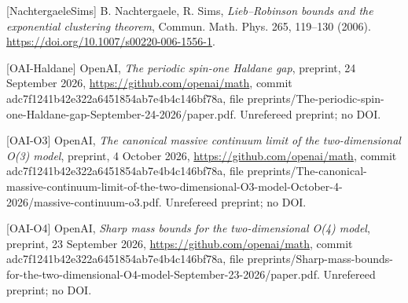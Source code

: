 \documentclass[10pt,letterpaper,twocolumn]{article}
\begin{document}
{[}NachtergaeleSims{]} B. Nachtergaele, R. Sims, \emph{Lieb--Robinson bounds and the exponential clustering theorem}, Commun. Math. Phys. 265, 119--130 (2006). \href{https://doi.org/10.1007/s00220-006-1556-1}{https:\allowbreak{}/\allowbreak{}/\allowbreak{}doi.\allowbreak{}org/\allowbreak{}10.\allowbreak{}1007/\allowbreak{}s00220-\allowbreak{}006-\allowbreak{}1556-\allowbreak{}1}.

{[}OAI-Haldane{]} OpenAI, \emph{The periodic spin-one Haldane gap}, preprint, 24 September 2026, \href{https://github.com/openai/math}{https:\allowbreak{}/\allowbreak{}/\allowbreak{}github.\allowbreak{}com/\allowbreak{}openai/\allowbreak{}math}, commit adc7f124\allowbreak{}1b42e322\allowbreak{}a6451854\allowbreak{}ab7e4b4c\allowbreak{}146bf78a\allowbreak{}, file preprint\allowbreak{}s/\allowbreak{}The-\allowbreak{}periodic\allowbreak{}-\allowbreak{}spin-\allowbreak{}one-\allowbreak{}Haldane-\allowbreak{}gap-\allowbreak{}Septembe\allowbreak{}r-\allowbreak{}24-\allowbreak{}2026/\allowbreak{}paper.\allowbreak{}pdf. Unrefereed preprint; no DOI.

{[}OAI-O3{]} OpenAI, \emph{The canonical massive continuum limit of the two-dimensional O(3) model}, preprint, 4 October 2026, \href{https://github.com/openai/math}{https:\allowbreak{}/\allowbreak{}/\allowbreak{}github.\allowbreak{}com/\allowbreak{}openai/\allowbreak{}math}, commit adc7f124\allowbreak{}1b42e322\allowbreak{}a6451854\allowbreak{}ab7e4b4c\allowbreak{}146bf78a\allowbreak{}, file preprint\allowbreak{}s/\allowbreak{}The-\allowbreak{}canonica\allowbreak{}l-\allowbreak{}massive-\allowbreak{}continuu\allowbreak{}m-\allowbreak{}limit-\allowbreak{}of-\allowbreak{}the-\allowbreak{}two-\allowbreak{}dimensio\allowbreak{}nal-\allowbreak{}O3-\allowbreak{}model-\allowbreak{}October-\allowbreak{}4-\allowbreak{}2026/\allowbreak{}massive-\allowbreak{}continuu\allowbreak{}m-\allowbreak{}o3.\allowbreak{}pdf. Unrefereed preprint; no DOI.

{[}OAI-O4{]} OpenAI, \emph{Sharp mass bounds for the two-dimensional O(4) model}, preprint, 23 September 2026, \href{https://github.com/openai/math}{https:\allowbreak{}/\allowbreak{}/\allowbreak{}github.\allowbreak{}com/\allowbreak{}openai/\allowbreak{}math}, commit adc7f124\allowbreak{}1b42e322\allowbreak{}a6451854\allowbreak{}ab7e4b4c\allowbreak{}146bf78a\allowbreak{}, file preprint\allowbreak{}s/\allowbreak{}Sharp-\allowbreak{}mass-\allowbreak{}bounds-\allowbreak{}for-\allowbreak{}the-\allowbreak{}two-\allowbreak{}dimensio\allowbreak{}nal-\allowbreak{}O4-\allowbreak{}model-\allowbreak{}Septembe\allowbreak{}r-\allowbreak{}23-\allowbreak{}2026/\allowbreak{}paper.\allowbreak{}pdf. Unrefereed preprint; no DOI.
\end{document}
